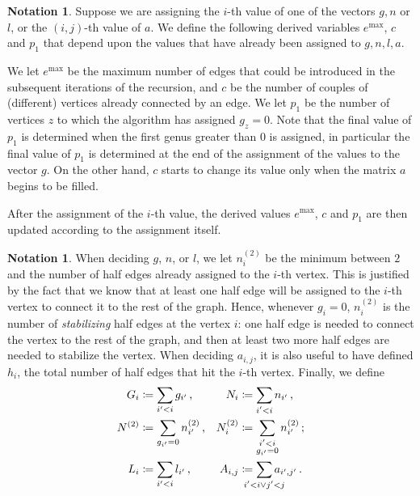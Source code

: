\documentclass{amsart}
\theoremstyle{plain}
\theoremstyle{definition}
\newtheorem{notation}[theorem]{Notation}
\DeclareMathOperator{\MAX}{max}
\begin{document}
\begin{notation}
  Suppose we are assigning the $i$-th value of one of the vectors
  $g,n$ or $l$, or the $(i,j)$-th value of $a$. We define the
  following derived variables $e^{\MAX}$, $c$ and $p_1$ that depend
  upon the values that have already been assigned to $g,n,l,a$.

  We let $e^{\MAX}$ be the maximum number of edges that could be
  introduced in the subsequent iterations of the recursion, and $c$ be
  the number of couples of (different) vertices already connected by
  an edge. We let $p_1$ be the number of vertices $z$ to which the
  algorithm has assigned $g_z = 0$.  Note that the final value of
  $p_1$ is determined when the first genus greater than $0$ is
  assigned, in particular the final value of $p_1$ is determined at
  the end of the assignment of the values to the vector $g$.  On the
  other hand, $c$ starts to change its value only when the matrix $a$
  begins to be filled.

  After the assignment of the $i$-th value, the derived values
  $e^{\MAX}$, $c$ and $p_1$ are then updated according to the
  assignment itself.
\end{notation}

\begin{notation} \label{not:partial_assign}
  When deciding $g$, $n$, or $l$, we let $n^{(2)}_i$ be the minimum
  between $2$ and the number of half edges already assigned to the
  $i$-th vertex. This is justified by the fact that we know that at
  least one half edge will be assigned to the $i$-th vertex to connect
  it to the rest of the graph. Hence, whenever $g_i = 0$, $n^{(2)}_i$
  is the number of \emph{stabilizing\/} half edges at the vertex $i$:
  one half edge is needed to connect the vertex to the rest of the
  graph, and then at least two more half edges are needed to stabilize
  the vertex. When deciding $a_{i,j}$, it is also useful to have
  defined $h_i$, the total number of half edges that hit the $i$-th
  vertex. Finally, we define
  \begin{align*}
    G_i &\coloneqq \sum_{i^\prime < i} g_{i^\prime}\,\text{,} &
    N_i &\coloneqq \sum_{\substack{i^\prime < i}} n_{i^\prime}\,\text{,}\\
    N^{(2)} &\coloneqq \sum_{g_{i^\prime} = 0} n^{(2)}_{i^\prime}\,\text{,} &
    N^{(2)}_i &\coloneqq \sum_{\substack{i^\prime < i\\g_{i^\prime} = 0}} n^{(2)}_{i^\prime}\,\text{;}\\
    L_i &\coloneqq \sum_{i^\prime < i} l_{i^\prime}\,\text{,} &
    A_{i,j} &\coloneqq \sum_{\mathclap{i^\prime < i \vee j^\prime < j}} a_{i^\prime, j^\prime}\,\text{.}
  \end{align*}
\end{notation}
\end{document}
